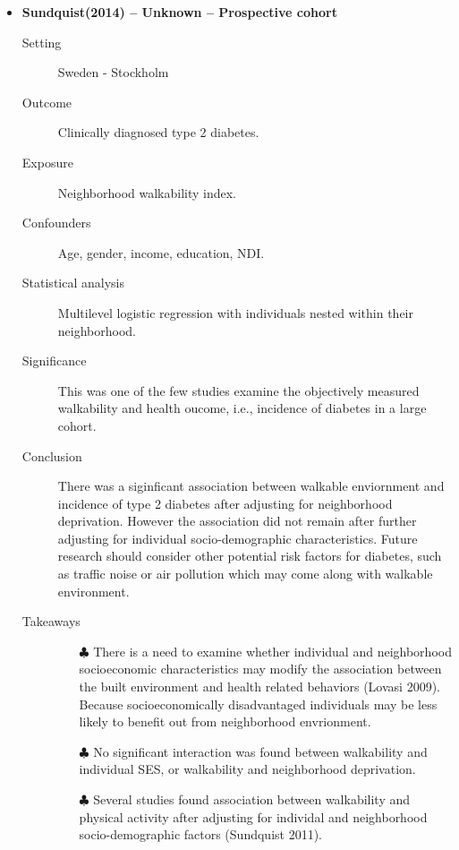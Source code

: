 \documentclass{article}
\begin{document}
\begin{itemize}
\item{\bf Sundquist(2014) -- Unknown  -- Prospective cohort} 
		\begin{description}
			\item[Setting] Sweden - Stockholm 
			\item[Outcome] Clinically diagnosed type 2 diabetes.
			\item[Exposure] Neighborhood walkability index.  
			\item[Confounders] Age, gender, income, education, NDI. 
			\item[Statistical analysis] Multilevel logistic regression with individuals nested within their neighborhood. 
			\item[Significance] This was one of the few studies examine the objectively measured walkability and health oucome, i.e., incidence of diabetes in a large cohort. 
			\item[Conclusion] There was a siginficant association between walkable enviornment and incidence of type 2 diabetes after adjusting for neighborhood deprivation. However the association did not remain after further adjusting for individual socio-demographic characteristics. Future research should consider other potential risk factors for diabetes, such as traffic noise or air pollution which may come along with walkable environment. 
			\item[Takeaways] \mbox{}\par
				\begin{itemize}
					\item[$\clubsuit$] There is a need to examine whether individual and neighborhood socioeconomic characteristics may modify the association between the built environment and health related behaviors (Lovasi 2009). Because socioeconomically disadvantaged individuals may be less likely to benefit out from neighborhood envrionment. 
					\item[$\clubsuit$] No significant interaction was found between walkability and individual SES, or walkability and neighborhood deprivation.
					\item[$\clubsuit$] Several studies found association between walkability and physical activity after adjusting for individal and neighborhood socio-demographic factors (Sundquist 2011). 
				\end{itemize} 
		\end{description}


\end{itemize}
\end{document}
